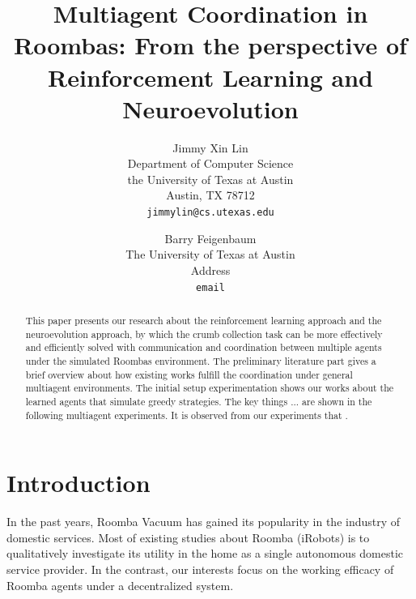 \documentclass[conference]{IEEEtran}
\begin{document}
%
\title{Multiagent Coordination in Roombas: From the perspective of
    Reinforcement Learning and Neuroevolution}



\author{ 
Jimmy Xin Lin \\
Department of Computer Science\\
the University of Texas at Austin\\
Austin, TX 78712 \\
\texttt{jimmylin@cs.utexas.edu} \\
\and
Barry Feigenbaum \\
The University of Texas at Austin \\
Address \\
\texttt{email} \\
}

\maketitle

\begin{abstract}
    This paper presents our research about the reinforcement learning approach
    and the neuroevolution approach, by which the crumb collection task can be
    more effectively and efficiently solved with communication and
    coordination between multiple agents under the simulated Roombas
    environment.
    The preliminary literature part gives a brief overview about how existing
    works fulfill the coordination under general multiagent environments.
    The initial setup experimentation shows our works about the
    learned agents that simulate greedy strategies.
    The key things ... are shown in the following multiagent experiments.
    It is observed from our experiments that .
\end{abstract}

\IEEEpeerreviewmaketitle



\section{Introduction}
In the past years, Roomba Vacuum has gained its popularity in the industry of
domestic services.  Most of existing studies about Roomba (iRobots) is to 
qualitatively investigate its utility in the home as a single autonomous
domestic service provider. In the contrast, our interests focus on the working
efficacy of Roomba agents under a decentralized system.
\end{document}
